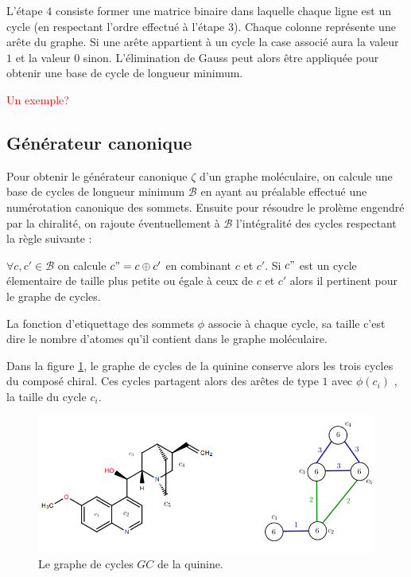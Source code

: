\vspace{0.5cm}

L'étape $4$ consiste former une matrice binaire dans laquelle chaque ligne est un cycle (en respectant l'ordre effectué à l'étape $3$). Chaque colonne représente une arête du graphe. Si une arête appartient à un cycle la case associé aura la valeur $1$ et la valeur $0
$ sinon. L'élimination de Gauss peut alors être appliquée pour obtenir une base de cycle de longueur minimum.

\textcolor{red}{Un exemple?}


\subsection{Générateur canonique}

Pour obtenir le générateur canonique $\zeta$ d'un graphe moléculaire, on calcule une base de cycles de longueur minimum $\mathcal{B}$ en ayant au préalable effectué une numérotation canonique des sommets.
Ensuite pour résoudre le prolème engendré par la chiralité, on rajoute éventuellement à $\mathcal{B}$ l'intégralité des cycles respectant la règle suivante :

\begin{center}
$\forall c,c' \in \mathcal{B}$ on calcule $c" = c \oplus c'$ en combinant $c$ et $c'$. Si $c"$ est un cycle élementaire de taille plus petite ou égale à ceux de $c$ et $c'$ alors il pertinent pour le graphe de cycles.
\end{center}

La fonction d'etiquettage des sommets $\phi$ associe à chaque cycle, sa taille c'est dire le nombre d'atomes qu'il contient dans le graphe moléculaire.

Dans la figure \ref{graphequinine}, le graphe de cycles de la quinine conserve alors les trois cycles du composé chiral. Ces cycles partagent alors des arêtes de type $1$ avec $\phi(c_i)$ , la taille du cycle $c_i$.

\begin{figure}[H]
\label{graphequinine}
\begin{center}
\includegraphics[scale=0.45]{graphe_quinine.png}
\end{center}
\caption{Le graphe de cycles $GC$ de la quinine.}
\end{figure}

